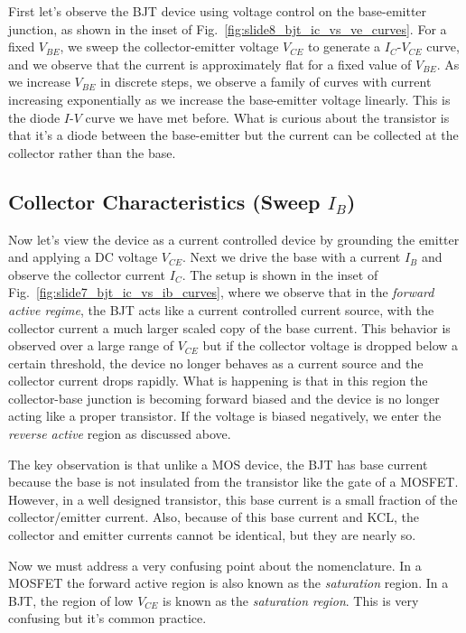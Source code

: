 First let's observe the BJT device using voltage control on the base-emitter junction, as shown in the inset of Fig.~\ref{fig:slide8_bjt_ic_vs_ve_curves}.  For a fixed $V_{BE}$, we sweep the collector-emitter voltage $V_{CE}$ to generate a $I_C$-$V_{CE}$ curve, and we observe that the current is approximately flat for a fixed value of $V_{BE}$.  As we increase $V_{BE}$ in discrete steps, we observe a family of curves with current increasing exponentially as we increase the base-emitter voltage linearly.  This is the diode $I$-$V$ curve we have met before.  What is curious about the transistor is that it's a diode between the base-emitter but the current can be collected at the collector rather than the base.
\subsection{Collector Characteristics (Sweep $I_B$)}
Now let's view the device as a current controlled device by grounding the emitter and applying a DC voltage $V_{CE}$.  Next we drive the base with a current $I_B$ and observe the collector current $I_C$.  The setup is shown in the inset of Fig.~\ref{fig:slide7_bjt_ic_vs_ib_curves}, where we observe that in the \emph{forward active regime}, the BJT acts like a current controlled current source, with the collector current a much larger scaled copy of the base current.  This behavior is observed over a large range of $V_{CE}$ but if the collector voltage is dropped below a certain threshold, the device no longer behaves as a current source and the collector current drops rapidly.  What is happening is that in this region the collector-base junction is becoming forward biased and the device is no longer acting like a proper transistor. If the voltage is biased negatively, we enter the \emph{reverse active} region as discussed above.

The key observation is that unlike a MOS device, the BJT has base current because the base is not insulated from the transistor like the gate of a MOSFET.  However, in a well designed transistor, this base current is a small fraction of the collector/emitter current.  Also, because of this base current and KCL, the collector and emitter currents cannot be identical, but they are nearly so.

Now we must address a very confusing point about the nomenclature.  In a MOSFET the forward active region is also known as the \emph{saturation} region.  In a BJT, the region of low $V_{CE}$ is known as the \emph{saturation region}.  This is very confusing but it's common practice.

